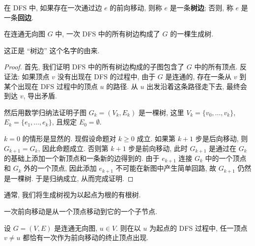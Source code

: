 \begin{definition}
    在 DFS 中, 如果存在一次通过边 $e$ 的前向移动, 则称 $e$ 是一条\textbf{树边}; 否则, 称 $e$ 是一条\textbf{回边}.
\end{definition}

\begin{theorem}
    在连通无向图 $G$ 中, 一次 DFS 中的所有树边构成了 $G$ 的一棵生成树.
\end{theorem}

这正是 ``树边'' 这个名字的由来.

\begin{proof}
    首先, 我们证明 DFS 中的所有树边构成的子图包含了 $G$ 中的所有顶点. 反证法: 如果顶点 $v$ 没有出现在 DFS 的过程中, 由于 $G$ 是连通的, 存在一条从 $v$ 到某个出现在 DFS 过程中的顶点 $u$ 的路径. 从 $u$ 出发沿着这条路径走下去, 最终会到达 $v$, 导出矛盾.

    然后用数学归纳法证明子图 $G_k=(V_k,E_k)$ 是一棵树, 这里 $V_k=\{v_0,\dots,v_k\}$, $E_k=\{e_1,\dots,e_k\}$, 且规定 $E_0=\emptyset$.

    $k=0$ 的情形是显然的. 现假设命题对 $k\geq 0$ 成立. 如果第 $k+1$ 步是后向移动, 则 $G_{k+1}=G_k$, 因此命题成立. 否则第 $k+1$ 步是前向移动, 此时 $G_{k+1}$ 是通过在 $G_k$ 的基础上添加一个新顶点和一条新的边得到的. 由于 $e_{k+1}$ 连接 $G_k$ 中的一个顶点和 $G_k$ 外的一个顶点, 因此添加 $e_{k+1}$ 不可能在新图中产生简单回路, 故 $G_{k+1}$ 仍然是一棵树. 于是归纳成立, 从而完成证明.
\end{proof}

通常, 我们将生成树视为以起点为根的有根树.

\begin{corollary}
    一次前向移动是从一个顶点移动到它的一个子节点.
\end{corollary}

\begin{lemma}
    设 $G=(V,E)$ 是连通无向图, $u\in V$. 则在以 $u$ 为起点的 DFS 过程中, 任一顶点 $v\neq u$ 都恰有一次作为前向移动的终止顶点出现.
\end{lemma}

